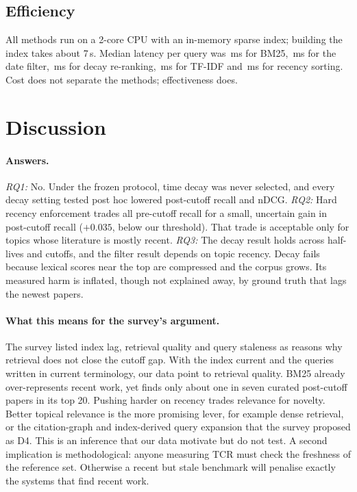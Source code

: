 \documentclass[acmsmall]{acmart}
\begin{document}
\subsection{Efficiency}
All methods run on a 2-core CPU with an in-memory sparse index; building the index takes about 7\,s. Median latency per query was \LatBM\,ms for BM25, \LatDF\,ms for the date filter, \LatDec\,ms for decay re-ranking, \LatTF\,ms for TF-IDF and \LatRec\,ms for recency sorting. Cost does not separate the methods; effectiveness does.

\section{Discussion}\label{sec:discussion}
\paragraph{Answers.} \emph{RQ1:} No. Under the frozen protocol, time decay was never selected, and every decay setting tested post hoc lowered post-cutoff recall and nDCG. \emph{RQ2:} Hard recency enforcement trades all pre-cutoff recall for a small, uncertain gain in post-cutoff recall ($+0.035$, below our threshold). That trade is acceptable only for topics whose literature is mostly recent. \emph{RQ3:} The decay result holds across half-lives and cutoffs, and the filter result depends on topic recency. Decay fails because lexical scores near the top are compressed and the corpus grows. Its measured harm is inflated, though not explained away, by ground truth that lags the newest papers.

\paragraph{What this means for the survey's argument.} The survey listed index lag, retrieval quality and query staleness as reasons why retrieval does not close the cutoff gap. With the index current and the queries written in current terminology, our data point to retrieval quality. BM25 already over-represents recent work, yet finds only about one in seven curated post-cutoff papers in its top 20. Pushing harder on recency trades relevance for novelty. Better topical relevance is the more promising lever, for example dense retrieval, or the citation-graph and index-derived query expansion that the survey proposed as D4. This is an inference that our data motivate but do not test. A second implication is methodological: anyone measuring TCR must check the freshness of the reference set. Otherwise a recent but stale benchmark will penalise exactly the systems that find recent work.
\end{document}
